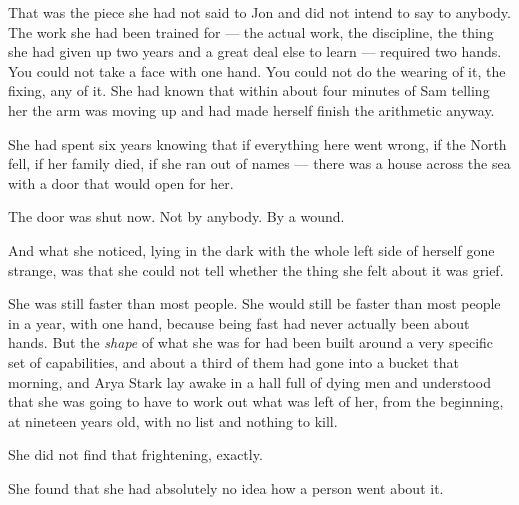 That was the piece she had not said to Jon and did not intend to say to anybody. The work she had been trained for — the actual work, the discipline, the thing she had given up two years and a great deal else to learn — required two hands. You could not take a face with one hand. You could not do the wearing of it, the fixing, any of it. She had known that within about four minutes of Sam telling her the arm was moving up and had made herself finish the arithmetic anyway.

She had spent six years knowing that if everything here went wrong, if the North fell, if her family died, if she ran out of names — there was a house across the sea with a door that would open for her.

The door was shut now. Not by anybody. By a wound.

And what she noticed, lying in the dark with the whole left side of herself gone strange, was that she could not tell whether the thing she felt about it was grief.

She was still faster than most people. She would still be faster than most people in a year, with one hand, because being fast had never actually been about hands. But the \textit{shape} of what she was for had been built around a very specific set of capabilities, and about a third of them had gone into a bucket that morning, and Arya Stark lay awake in a hall full of dying men and understood that she was going to have to work out what was left of her, from the beginning, at nineteen years old, with no list and nothing to kill.

She did not find that frightening, exactly.

She found that she had absolutely no idea how a person went about it.